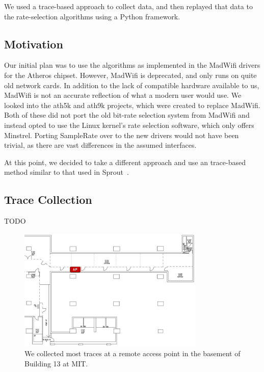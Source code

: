\documentclass[letterpaper,twocolumn,10pt]{article}
\begin{document}
We used a trace-based approach to collect data, and then replayed that data to the rate-selection algorithms using a Python framework.

\subsection{Motivation}

Our initial plan was to use the algorithms as implemented in the MadWifi drivers for the Atheros chipset. However, MadWifi is deprecated, and only runs on quite old network cards. In addition to the lack of compatible hardware available to us, MadWifi is not an accurate reflection of what a modern user would use. We looked into the ath5k and ath9k projects, which were created to replace MadWifi. Both of these did not port the old bit-rate selection system from MadWifi and instead opted to use the Linux kernel's rate selection software, which only offers Minstrel. Porting SampleRate over to the new drivers would not have been trivial, as there are vast differences in the assumed interfaces. 

At this point, we decided to take a different approach and use an trace-based method similar to that used in Sprout~\cite{sprout}.


\subsection{Trace Collection}

TODO

\begin{figure}[hbt]
  \hspace{-0.5em}\includegraphics[width=3.5in]{bsmt13floorplan.png}\vspace{-0em}
  \caption{We collected most traces at a remote access point in the basement of Building 13 at MIT.}
\label{figure:1}
\end{figure}
\end{document}
